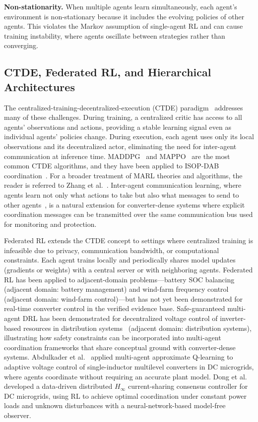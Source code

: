 \documentclass[manuscript,screen,review]{acmart}
\begin{document}
\textbf{Non-stationarity.}
When multiple agents learn simultaneously, each agent's environment is non-stationary because it includes the evolving policies of other agents.
This violates the Markov assumption of single-agent RL and can cause training instability, where agents oscillate between strategies rather than converging.

\subsection{CTDE, Federated RL, and Hierarchical Architectures}

The centralized-training-decentralized-execution (CTDE) paradigm~\cite{oliehoek2016concise,lowe2017multi} addresses many of these challenges.
During training, a centralized critic has access to all agents' observations and actions, providing a stable learning signal even as individual agents' policies change.
During execution, each agent uses only its local observations and its decentralized actor, eliminating the need for inter-agent communication at inference time.
MADDPG~\cite{lowe2017multi} and MAPPO~\cite{yu2022surprising} are the most common CTDE algorithms, and they have been applied to ISOP-DAB coordination~\cite{zeng2022autonomous,zeng2022multiagent}.
For a broader treatment of MARL theories and algorithms, the reader is referred to Zhang et al.~\cite{zhang2021multi}.
Inter-agent communication learning, where agents learn not only what actions to take but also what messages to send to other agents~\cite{foerster2016learning}, is a natural extension for converter-dense systems where explicit coordination messages can be transmitted over the same communication bus used for monitoring and protection.

Federated RL extends the CTDE concept to settings where centralized training is infeasible due to privacy, communication bandwidth, or computational constraints.
Each agent trains locally and periodically shares model updates (gradients or weights) with a central server or with neighboring agents.
Federated RL has been applied to adjacent-domain problems---battery SOC balancing~\cite{chen2024asynchronous} (adjacent domain: battery management) and wind-farm frequency control~\cite{liang2022multiagent} (adjacent domain: wind-farm control)---but has not yet been demonstrated for real-time converter control in the verified evidence base.
Safe-guaranteed multi-agent DRL has been demonstrated for decentralized voltage control of inverter-based resources in distribution systems~\cite{zhang2023data} (adjacent domain: distribution systems), illustrating how safety constraints can be incorporated into multi-agent coordination frameworks that share conceptual ground with converter-dense systems.
Abdulkader et al.~\cite{abdulkader2024adaptive} applied multi-agent approximate Q-learning to adaptive voltage control of single-inductor multilevel converters in DC microgrids, where agents coordinate without requiring an accurate plant model.
Dong et al.~\cite{dong2024data} developed a data-driven distributed $H_\infty$ current-sharing consensus controller for DC microgrids, using RL to achieve optimal coordination under constant power loads and unknown disturbances with a neural-network-based model-free observer.
\end{document}
